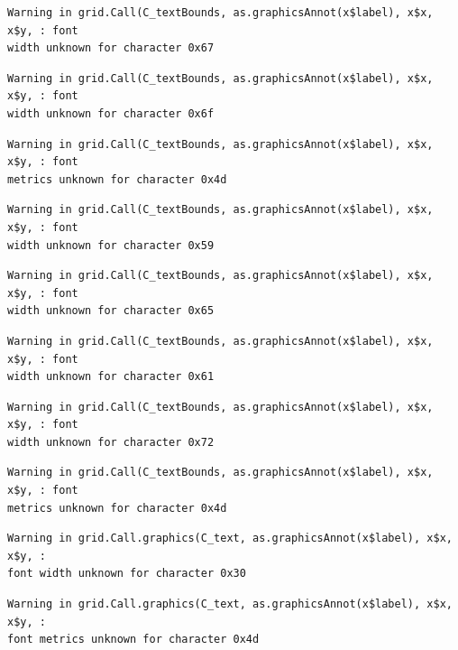 \documentclass[
  letterpaper,
]{scrbook}
\begin{document}
\begin{verbatim}
Warning in grid.Call(C_textBounds, as.graphicsAnnot(x$label), x$x, x$y, : font
width unknown for character 0x67
\end{verbatim}

\begin{verbatim}
Warning in grid.Call(C_textBounds, as.graphicsAnnot(x$label), x$x, x$y, : font
width unknown for character 0x6f
\end{verbatim}

\begin{verbatim}
Warning in grid.Call(C_textBounds, as.graphicsAnnot(x$label), x$x, x$y, : font
metrics unknown for character 0x4d
\end{verbatim}

\begin{verbatim}
Warning in grid.Call(C_textBounds, as.graphicsAnnot(x$label), x$x, x$y, : font
width unknown for character 0x59
\end{verbatim}

\begin{verbatim}
Warning in grid.Call(C_textBounds, as.graphicsAnnot(x$label), x$x, x$y, : font
width unknown for character 0x65
\end{verbatim}

\begin{verbatim}
Warning in grid.Call(C_textBounds, as.graphicsAnnot(x$label), x$x, x$y, : font
width unknown for character 0x61
\end{verbatim}

\begin{verbatim}
Warning in grid.Call(C_textBounds, as.graphicsAnnot(x$label), x$x, x$y, : font
width unknown for character 0x72
\end{verbatim}

\begin{verbatim}
Warning in grid.Call(C_textBounds, as.graphicsAnnot(x$label), x$x, x$y, : font
metrics unknown for character 0x4d
\end{verbatim}

\begin{verbatim}
Warning in grid.Call.graphics(C_text, as.graphicsAnnot(x$label), x$x, x$y, :
font width unknown for character 0x30
\end{verbatim}

\begin{verbatim}
Warning in grid.Call.graphics(C_text, as.graphicsAnnot(x$label), x$x, x$y, :
font metrics unknown for character 0x4d
\end{verbatim}
\end{document}
